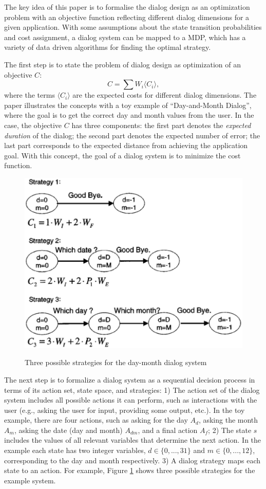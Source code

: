 \documentclass[paper=a4, fontsize=18pt]{article} %
\numberwithin{equation}{section} %
\numberwithin{figure}{section} %
\numberwithin{table}{section} %
\begin{document}
The key idea of this paper is to formalise the dialog design as an optimization problem with an objective function reflecting different dialog dimensions for a given application. With some assumptions about the state transition probabilities and cost assignment, a dialog system can be mapped to a MDP, which has a variety of data driven algorithms for finding the optimal strategy.

The first step is to state the problem of dialog design as optimization of an objective $C$:
$$C = \sum W_i \langle C_i \rangle,$$
where the terms $\langle C_i \rangle$ are the expected costs for different dialog dimensions. The paper illustrates the concepts with a toy example of ``Day-and-Month Dialog'', where the goal is to get the correct day and month values from the user. In the case, the objective $C$ has three components: the first part denotes the \emph{expected duration} of the dialog; the second part denotes the expected number of error; the last part corresponds to the expected distance from achieving the application goal. With this concept, the goal of a dialog system is to minimize the cost function.

\begin{figure}[htbp]
  \centering
  \includegraphics[width=.6\linewidth]{10_17_dialog_MDP1}\\
  \caption{Three possible strategies for the day-month dialog system}\label{fig:dialog_MDP1}
\end{figure}

The next step is to formalize a dialog system as a sequential decision process in terms of its action set, state space, and strategies: 1) The action set of the dialog system includes all possible actions it can perform, such as interactions with the user (e.g., asking the user for input, providing some output, etc.). In the toy example, there are four actions, such as asking for the day $A_d$, asking the month $A_m$, asking the date (day and month) $A_{dm}$, and a final action $A_f$; 2) The state $s$ includes the values of all relevant variables that determine the next action. In the example each state has two integer variables, $d \in \{0, ..., 31\}$ and $m \in \{0, ..., 12\}$, corresponding to the day and month respectively. 3) A dialog strategy maps each state to an action. For example, Figure \ref{fig:dialog_MDP1} shows three possible strategies for the example system.
\end{document}
